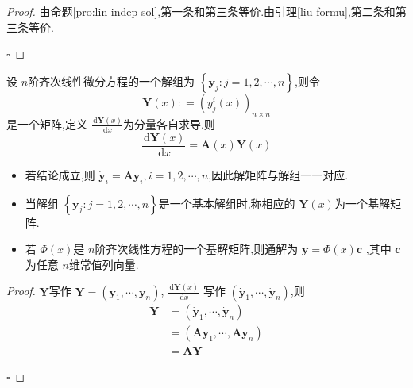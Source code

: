 \documentclass[lang=cn,12pt,color=green,fontset=none]{elegantbook}
\begin{document}
\begin{proof}
    由命题\ref{pro:lin-indep-sol},第一条和第三条等价.由引理\ref{liu-formu},第二条和第三条等价.

    \hfill $\square$
\end{proof}

\begin{definition}
    设 $ n $阶齐次线性微分方程的一个解组为 $ \left\{ \mathbf{y}_{j}: j=1,2,\cdots,n \right\} $,则令 $$
    \mathbf{Y}\left( x \right): = \left( y_{j}^{i}\left( x \right)  \right)_{n\times n}  
    $$是一个矩阵,定义 $ \frac{\,\mathrm{d} \mathbf{Y}\left( x \right)  }{\,\mathrm{d} x }  $为分量各自求导.则 $$
    \frac{\,\mathrm{d} \mathbf{Y}\left( x \right)  }{ \,\mathrm{d} x}  = \mathbf{A}\left( x \right)\mathbf{Y} \left( x \right) 
    $$   
\end{definition}

\begin{remark}\label{sol-matrix-def}
    \begin{itemize}
        \item 若结论成立,则 $ \dot{\mathbf{y}}_{i} = \mathbf{A}\mathbf{y}_{i},i=1,2,\cdots,n $,因此解矩阵与解组一一对应. 
        \item 当解组 $ \left\{ \mathbf{y}_{j}: j=1,2,\cdots,n \right\} $是一个基本解组时,称相应的 $ \mathbf{Y}\left( x \right)  $为一个基解矩阵.
        \item 若 $ \Phi \left( x \right)  $是 $ n $阶齐次线性方程的一个基解矩阵,则通解为 $ \mathbf{y}=\Phi \left( x \right) \mathbf{c}  $   ,其中 $ \mathbf{c} $为任意 $ n $维常值列向量.    
    \end{itemize}
    
\end{remark}

\begin{proof}
     $ \mathbf{Y} $写作 $ \mathbf{Y}=\left( \mathbf{y}_{1},\cdots ,\mathbf{y}_{n} \right)  $, $ \frac{\,\mathrm{d} \mathbf{Y}\left( x \right)  }{\,\mathrm{d} x }  $   写作 $ \left(  \dot{\mathbf{y}}_{1},\cdots ,\dot{\mathbf{y}}_{n} \right)  $,则 $$
    \begin{aligned}
        \dot{\mathbf{Y}}& = \left( \dot{\mathbf{y}}_{1},\cdots ,\dot{\mathbf{y}}_{n} \right)  \\ 
         & = \left( \mathbf{A}\mathbf{y}_{1},\cdots ,\mathbf{A}\mathbf{y}_{n} \right) \\ 
          & = \mathbf{A} \mathbf{Y}
    \end{aligned} 
     $$ 

    \hfill $\square$
\end{proof}
\end{document}
